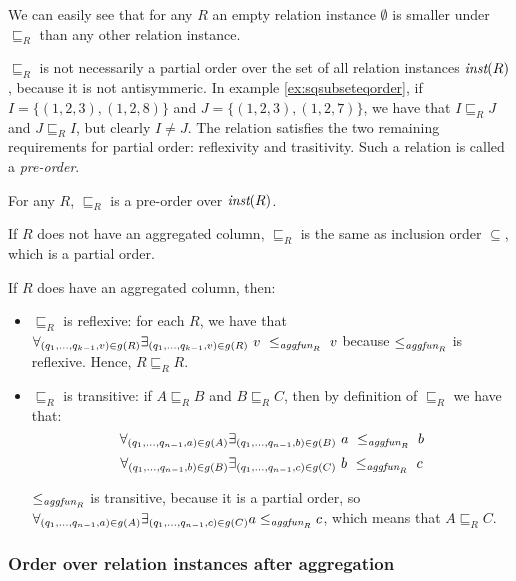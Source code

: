 We can easily see that for any $R$ an empty relation instance $\emptyset$ is smaller under $\sqsubseteq_R$  than any other relation instance.


$\sqsubseteq_R$ is not necessarily a partial order over the set of all relation instances $\textit{inst}(R)$, because it is not antisymmeric. In example \ref{ex:sqsubseteqorder}, if $I = \{(1, 2, 3), (1, 2, 8)\}$ and $J = \{(1, 2, 3), (1, 2, 7)\}$, we have that $I \sqsubseteq_R J$ and $J \sqsubseteq_R I$, but clearly $I \ne J$. The relation satisfies the two remaining requirements for partial order: reflexivity and trasitivity. Such a relation is called a \emph{pre-order}.

\begin{lem}
For any $R$, $\sqsubseteq_R$ is a pre-order over $\textit{inst}(R)$.
\end{lem}\label{lem:preorder}

\begin{prof}

If $R$ does not have an aggregated column, $\sqsubseteq_R$ is the same as inclusion order $\subseteq$, which is a partial order.

If $R$ does have an aggregated column, then:

\begin{itemize}
\item $\sqsubseteq_R$ is reflexive: for each $R$, we have that  $\forall_{(q_1, ..., q_{k-1}, v) \in g(R)} \exists_{(q_1, ..., q_{k-1}, v) \in g(R)}~v~\le_{\textit{aggfun}_R}~v$ because $\le_{\textit{aggfun}_R}$ is reflexive. Hence, $R \sqsubseteq_R R$.
\item $\sqsubseteq_R$ is transitive: if $A \sqsubseteq_R B$ and $B \sqsubseteq_R  C$, then by definition of $\sqsubseteq_R$ we have that: $$\forall_{(q_1, ..., q_{n-1}, a) \in g(A)} \exists_{(q_1, ..., q_{n-1}, b) \in g(B)}~a~\le_{\textit{aggfun}_R}~b $$ $$\forall_{(q_1, ..., q_{n-1}, b) \in g(B)} \exists_{(q_1, ..., q_{n-1}, c) \in g(C)}~b~\le_{\textit{aggfun}_R}~c$$

$\le_{\textit{aggfun}_R}$ is transitive, because it is a partial order, so $\forall_{(q_1, ..., q_{n-1}, a) \in g(A)} \exists_{(q_1, ..., q_{n-1}, c) \in g(C)} a \le_{\textit{aggfun}_R} c $, which means that $A \sqsubseteq_R C$.
\end{itemize}

\end{prof}

\subsubsection{Order over relation instances after aggregation}

